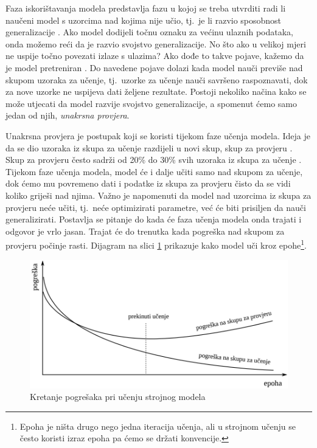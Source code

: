 \documentclass[times, utf8, zavrsni]{fer}
\begin{document}
Faza iskorištavanja modela predstavlja fazu u kojoj se treba utvrditi radi li naučeni model s uzorcima nad kojima nije učio, tj.\ je li razvio sposobnost generalizacije . Ako model dodijeli točnu oznaku za većinu ulaznih podataka, onda možemo reći da je razvio svojstvo generalizacije. No što ako u velikoj mjeri ne uspije točno povezati izlaze s ulazima? Ako dođe to takve pojave, kažemo da je model pretreniran . Do navedene pojave dolazi kada model nauči previše nad skupom uzoraka za učenje, tj.\ uzorke za učenje nauči savršeno raspoznavati, dok za nove uzorke ne uspijeva dati željene rezultate. Postoji nekoliko načina kako se može utjecati da model razvije svojstvo generalizacije, a spomenut ćemo samo jedan od njih, \textit{unakrsna provjera}.

Unakrsna provjera  je postupak koji se koristi tijekom faze učenja modela. Ideja je da se dio uzoraka iz skupa za učenje razdijeli u novi skup, skup za provjeru . Skup za provjeru često sadrži od 20\% do 30\% svih uzoraka iz skupa za učenje \citep{cupicML}. Tijekom faze učenja modela, model će i dalje učiti samo nad skupom za učenje, dok ćemo mu povremeno dati i podatke iz skupa za provjeru čisto da se vidi koliko griješi nad njima. Važno je napomenuti da model nad uzorcima iz skupa za provjeru neće učiti, tj.\ neće optimizirati parametre, već će biti prisiljen da nauči generalizirati. Postavlja se pitanje do kada će faza učenja modela onda trajati i odgovor je vrlo jasan. Trajat će do trenutka kada pogreška nad skupom za provjeru počinje rasti. Dijagram na slici \ref{fig:cross-validation} prikazuje kako model uči kroz epohe\footnote{Epoha je ništa drugo nego jedna iteracija učenja, ali u strojnom učenju se često koristi izraz epoha pa ćemo se držati konvencije.}.

\begin{figure}[H]
    \centering
    \includegraphics[scale=0.5]{img/cross-validation.png}
    \caption[Caption for LOF]{Kretanje pogrešaka pri učenju strojnog modela\footnotemark}
    \label{fig:cross-validation}
\end{figure}
\end{document}
